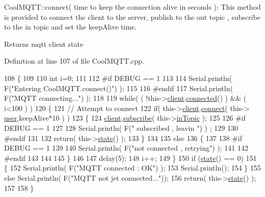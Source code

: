Cool\+M\+Q\+T\+T\+::connect( time to keep the connection alive in seconds )\+: This method is provided to connect the client to the server, publish to the out topic , subscribe to the in topic and set the keep\+Alive time.

\begin{DoxyReturn}{Returns}
mqtt client state 
\end{DoxyReturn}


Definition at line 107 of file Cool\+M\+Q\+T\+T.\+cpp.


\begin{DoxyCode}
108 \{       
109 
110     \textcolor{keywordtype}{int} i=0;
111 
112 \textcolor{preprocessor}{#if DEBUG == 1 }
113 
114     Serial.println( F(\textcolor{stringliteral}{"Entering CoolMQTT.connect()"}) );
115 
116 \textcolor{preprocessor}{#endif}
117     Serial.println( F(\textcolor{stringliteral}{"MQTT connecting..."}) );
118     
119     \textcolor{keywordflow}{while}( ( !this->\hyperlink{class_cool_m_q_t_t_afed1372683c44893b4668d0f1771f514}{client}.\hyperlink{class_cool_pub_sub_client_a3d5a5da4ddb1e5c1bea64d80c665d148}{connected}() ) && ( i<100 ) ) 
120     \{
121         \textcolor{comment}{// Attempt to connect}
122         \textcolor{keywordflow}{if}( this->\hyperlink{class_cool_m_q_t_t_afed1372683c44893b4668d0f1771f514}{client}.\hyperlink{class_cool_pub_sub_client_a2664c2ebc302b2fa49f493a339ecc891}{connect}( this-> \hyperlink{class_cool_m_q_t_t_a8cd47e45d457f908d4b4390b35aaee83}{user},keepAlive*10  ) )
123         \{
124             \hyperlink{class_cool_m_q_t_t_afed1372683c44893b4668d0f1771f514}{client}.\hyperlink{class_cool_pub_sub_client_ac1ebc9ad874128aefa985d78496d2e8f}{subscribe}( this->\hyperlink{class_cool_m_q_t_t_a4492f52a441e83cc5151010317fdb52d}{inTopic} );
125 
126 \textcolor{preprocessor}{        #if DEBUG == 1 }
127 
128             Serial.println( F(\textcolor{stringliteral}{" subscribed , leavin "}) ) ;
129         
130 \textcolor{preprocessor}{        #endif}
131 
132             \textcolor{keywordflow}{return}( this->\hyperlink{class_cool_m_q_t_t_a5d003307eff78efbd585e42b43b72b6d}{state}() );
133         \}
134 
135         \textcolor{keywordflow}{else}
136         \{
137         
138 \textcolor{preprocessor}{        #if DEBUG == 1 }
139 
140             Serial.println( F(\textcolor{stringliteral}{"not connected , retrying"}) );
141         
142 \textcolor{preprocessor}{        #endif}
143 
144             
145         \}
146 
147     delay(5);
148     i++;
149     \}
150     \textcolor{keywordflow}{if} (\hyperlink{class_cool_m_q_t_t_a5d003307eff78efbd585e42b43b72b6d}{state}() == 0)
151     \{
152         Serial.println( F(\textcolor{stringliteral}{"MQTT connected : OK"}) );
153         Serial.println();
154     \}
155     \textcolor{keywordflow}{else} Serial.println( F(\textcolor{stringliteral}{"MQTT not jet connected..."}));
156     \textcolor{keywordflow}{return}( this->\hyperlink{class_cool_m_q_t_t_a5d003307eff78efbd585e42b43b72b6d}{state}() );
157 
158 \}
\end{DoxyCode}
